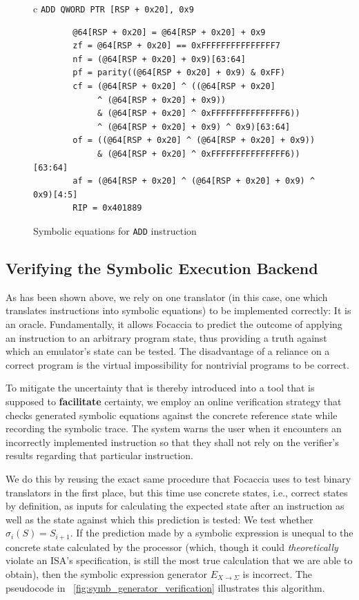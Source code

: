 \begin{figure}[htbp]
    \centering
    \begin{tabular}{c}
    \texttt{ADD        QWORD PTR [RSP + 0x20], 0x9} \\
    \midrule
    \begin{lstlisting}
        @64[RSP + 0x20] = @64[RSP + 0x20] + 0x9
        zf = @64[RSP + 0x20] == 0xFFFFFFFFFFFFFFF7
        nf = (@64[RSP + 0x20] + 0x9)[63:64]
        pf = parity((@64[RSP + 0x20] + 0x9) & 0xFF)
        cf = (@64[RSP + 0x20] ^ ((@64[RSP + 0x20]
             ^ (@64[RSP + 0x20] + 0x9))
             & (@64[RSP + 0x20] ^ 0xFFFFFFFFFFFFFFF6))
             ^ (@64[RSP + 0x20] + 0x9) ^ 0x9)[63:64]
        of = ((@64[RSP + 0x20] ^ (@64[RSP + 0x20] + 0x9))
             & (@64[RSP + 0x20] ^ 0xFFFFFFFFFFFFFFF6))[63:64]
        af = (@64[RSP + 0x20] ^ (@64[RSP + 0x20] + 0x9) ^ 0x9)[4:5]
        RIP = 0x401889
    \end{lstlisting}
    \end{tabular}
    \caption[]{Symbolic equations for \texttt{ADD} instruction}\label{fig:symb_equation_add}
\end{figure}

\subsection{Verifying the Symbolic Execution Backend}\label{sec:symb_exec_backend}

As has been shown above, we rely on one translator (in this case, one which translates instructions into symbolic
equations) to be implemented correctly: It is an oracle. Fundamentally, it allows Focaccia to predict the outcome of
applying an instruction to an arbitrary program state, thus providing a truth against which an emulator's state can be
tested. The disadvantage of a reliance on a correct program is the virtual impossibility for nontrivial programs to be
correct.

To mitigate the uncertainty that is thereby introduced into a tool that is supposed to \textbf{facilitate} certainty, we
employ an online verification strategy that checks generated symbolic equations against the concrete reference state
while recording the symbolic trace. The system warns the user when it encounters an incorrectly implemented instruction
so that they shall not rely on the verifier's results regarding that particular instruction.

We do this by reusing the exact same procedure that Focaccia uses to test binary translators in the first place, but
this time use concrete states, i.e., correct states by definition, as inputs for calculating the expected state after an
instruction as well as the state against which this prediction is tested: We test whether $\sigma_i(S) = S_{i+1}$. If
the prediction made by a symbolic expression is unequal to the concrete state calculated by the processor (which, though
it could \textit{theoretically} violate an \ac{ISA}'s specification, is still the most true calculation that we are able
to obtain), then the symbolic expression generator $E_{X \rightarrow \Sigma}$ is incorrect. The pseudocode in
\figurename~\ref{fig:symb_generator_verification} illustrates this algorithm.

